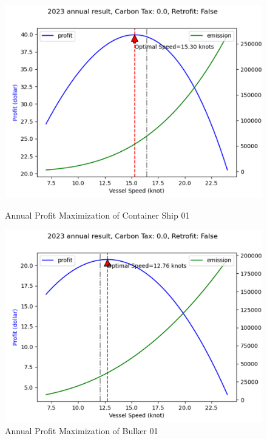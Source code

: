 \documentclass[a4paper,12pt]{article}
\begin{document}
\begin{figure}[htbp]
	\centering
	\begin{minipage}[t]{0.49\textwidth}
		\centering
		\includegraphics[width= \linewidth]{report-fig/container01.png}
		\caption{Annual Profit Maximization of Container Ship 01}
		\label{fig:container01}
	\end{minipage}
	\begin{minipage}[t]{0.49\textwidth}
		\centering
		\includegraphics[width= \linewidth]{report-fig/bulker01.png}
		\caption{Annual Profit Maximization of Bulker 01}
		\label{fig:bulker01}
	\end{minipage}
\end{figure}
\end{document}
